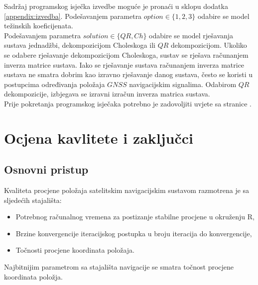 \documentclass[a4paper,twoside,12pt]{memoir} %
\begin{document}
Sadržaj programskog isječka izvedbe moguće je pronaći u sklopu dodatka \ref{appendix:izvedba}.
Podešavanjem parametra $option \in \{1,2,3\}$ odabire se model težinskih koeficijenata.\\
Podešavanjem parametra $solution \in \{QR,Ch\}$ odabire se model rješavanja sustava jednadžbi, dekompozicijom Choleskoga ili $QR$ dekompozicijom.
Ukoliko se odabere rješavanje dekompozicijom Choleskoga, sustav se rješava računanjem inverza matrice sustava.
Iako se rješavanje sustava računanjem inverza matrice sustava ne smatra dobrim kao izravno rješavanje danog 
sustava, često se koristi u postupcima određivanja položaja $GNSS$ navigacijskim signalima.
Odabirom $QR$ dekompozicije, izbjegava se izravni izračun inverza matrica sustava.
\vspace{0.2cm}\\
Prije pokretanja programskog isječaka potrebno je zadovoljiti uvjete sa stranice \pageref{run:zahtjevi}.

\chapter{Ocjena kavlitete i zaključci}
\section{Osnovni pristup}
Kvaliteta procjene položaja satelitskim navigacijskim sustavom razmotrena je sa sljedećih stajališta:
\begin{itemize}\label{run:kvaliteta}
	\item Potrebnog računalnog vremena za postizanje stabilne procjene u okruženju R,
	\item Brzine konvergencije iteracijskog postupka u broju iteracija do konvergencije,
	\item Točnosti procjene koordinata položaja.
\end{itemize}
Najbitnijim parametrom sa stajališta navigacije se smatra točnost procjene koordinata položja.\\
\end{document}

